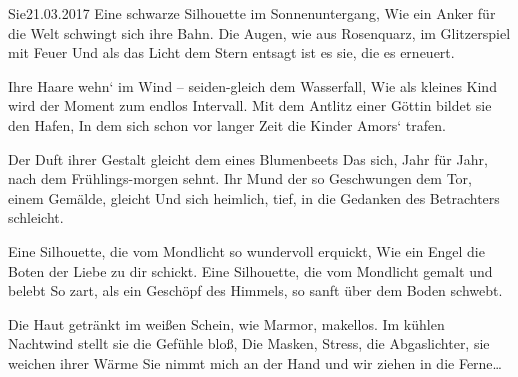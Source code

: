 \begin{poem}[][ornahat]{Sie}{21.03.2017}
Eine schwarze Silhouette im Sonnenuntergang,
Wie ein Anker für die Welt schwingt sich ihre Bahn.
Die Augen, wie aus Rosenquarz, im Glitzerspiel mit Feuer
Und als das Licht dem Stern entsagt ist es sie, die es erneuert.

Ihre Haare wehn‘ im Wind – seiden-gleich dem Wasserfall,
Wie als kleines Kind wird der Moment zum endlos Intervall.
Mit dem Antlitz einer Göttin bildet sie den Hafen,
In dem sich schon vor langer Zeit die Kinder Amors‘ trafen.

Der Duft ihrer Gestalt gleicht dem eines Blumenbeets
Das sich, Jahr für Jahr, nach dem Frühlings-morgen sehnt.
Ihr Mund der so Geschwungen dem Tor, einem Gemälde, gleicht
Und sich heimlich, tief, in die Gedanken des Betrachters schleicht.

Eine Silhouette, die vom Mondlicht so wundervoll erquickt,
Wie ein Engel die Boten der Liebe zu dir schickt.
Eine Silhouette, die vom Mondlicht gemalt und belebt
So zart, als ein Geschöpf des Himmels, so sanft über dem Boden schwebt.

Die Haut getränkt im weißen Schein, wie Marmor, makellos.
Im kühlen Nachtwind stellt sie die Gefühle bloß,
Die Masken, Stress, die Abgaslichter, sie weichen ihrer Wärme
Sie nimmt mich an der Hand und wir ziehen in die Ferne\ldots
\end{poem}
